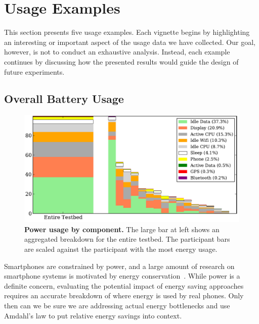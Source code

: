 \section{Usage Examples}
\label{sec-usage}


This section presents five \PhoneLab{} usage examples. Each vignette begins by
highlighting an interesting or important aspect of the usage data we have
collected. Our goal, however, is not to conduct an exhaustive analysis.
Instead, each example continues by discussing how the presented results would
guide the design of future \PhoneLab{} experiments.

\subsection{Overall Battery Usage}
\label{subsec-batteryoverview}

\begin{figure}[t]
\includegraphics[width=\textwidth]{./figures/power/breakdown/graph.pdf}
\caption{\textbf{Power usage by component.} The large bar at left shows an
aggregated breakdown for the entire testbed. The participant bars are scaled
against the participant with the most energy usage.}
\label{figure-batteryoverview}
\end{figure}

Smartphones are constrained by power, and a large amount of research on
smartphone systems is motivated by energy
conservation~\cite{shye:micro:2009,banerjee:ubicomp:2007,ace-mobisys12}. While
power is a definite concern, evaluating the potential impact of energy saving
approaches requires an accurate breakdown of where energy is used by real
phones. Only then can we be sure we are addressing actual energy bottlenecks and
use Amdahl's law to put relative energy savings into context.

